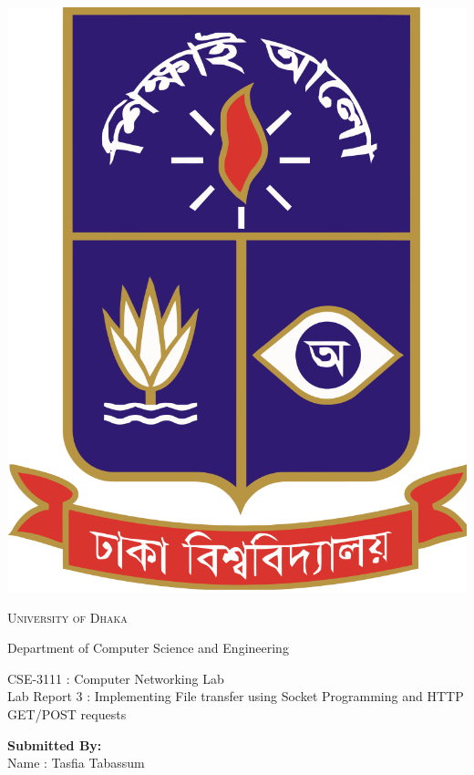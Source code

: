 \documentclass[11pt]{article}
\begin{document}
\begin{titlepage}
	\begin{center}
    	\includegraphics[scale=0.10]{du.png}\par
		\begin{Huge}
			\textsc{University of Dhaka}\par
		\end{Huge}
		\begin{Large}
			Department of Computer Science and Engineering\par \vspace{1cm}
			CSE-3111 : Computer Networking Lab \\[12pt]	
			Lab Report 3 : Implementing File transfer using Socket Programming and HTTP GET/POST requests
		\end{Large}
	\end{center}  	
	\begin{large}
		\textbf{Submitted By:\\[12pt]}
			Name : Tasfia Tabassum\\[8pt]

\end{large}
\end{titlepage}
\end{document}
